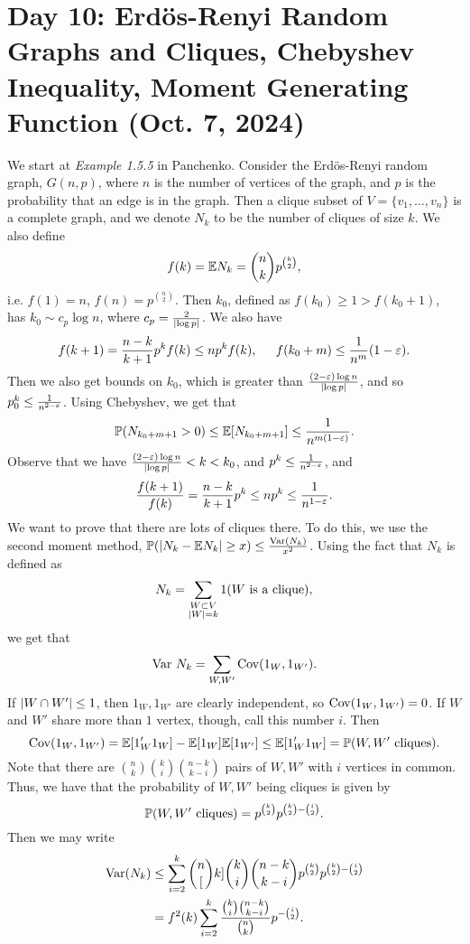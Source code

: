\section{Day 10: Erd\"os-Renyi Random Graphs and Cliques, Chebyshev Inequality, Moment Generating Function (Oct. 7, 2024)}
We start at \textit{Example 1.5.5} in Panchenko. Consider the Erd\"os-Renyi random graph, $G(n, p)$, where $n$ is the number of vertices of the graph, and $p$ is the probability that an edge is in the graph. Then a clique subset of $V = \{v_1, \dots, v_n\}$ is a complete graph, and we denote $N_k$ to be the number of cliques of size $k$. We also define
\[ f(k) = \mathbb E N_k = \binom{n}{k} p^{\binom{k}{{2}}}, \]
i.e. $f(1) = n$, $f(n) = p^{\binom{n}{2}}$. Then $k_0$, defined as $f(k_0) \geq 1 > f(k_0 + 1)$, has $k_0 \sim c_p \log n$, where $c_p = \frac{2}{\left\lvert \log p \right\rvert}$. We also have
\[ f(k + 1) = \frac{n-k}{k+1} p^k f(k) \leq np ^k f(k), \hspace{0.2in} f(k_0 + m) \leq \frac{1}{n^m}(1 - \varepsilon). \]
Then we also get bounds on $k_0$, which is greater than $\frac{(2 - \varepsilon)\log n}{\left\lvert \log p \right\rvert}$, and so $p^k_0 \leq \frac{1}{n^{2 - \varepsilon}}$.
\medskip\newline
Using Chebyshev, we get that
\[ \mathbb P(N_{k_0 + m + 1} > 0) \leq \mathbb E[N_{k_0 + m + 1}] \leq \frac{1}{n^{m(1 - \varepsilon)}}. \]
Observe that we have $\frac{(2 - \varepsilon) \log n}{\left\lvert \log p \right\rvert} < k < k_0$, and $p^k \leq \frac{1}{n^{2-\varepsilon}}$, and
\[ \frac{f(k + 1)}{f(k)} = \frac{n-k}{k+1}p^k \leq np^k \leq \frac{1}{n^{1 - \varepsilon}}. \]
We want to prove that there are lots of cliques there. To do this, we use the second moment method, $\mathbb P(\left\lvert N_k - \mathbb E N_k \right\rvert \geq x) \leq \frac{\operatorname{Var}(N_k)}{x^2}$. Using the fact that $N_k$ is defined as
\[ N_k = \sum_{\substack{W \subset V \\ \left\lvert W \right\rvert = k}} 1(W \text{ is a clique}), \]
we get that
\[ \operatorname{Var} \, N_k = \sum_{W, W'} \mathrm{Cov}(1_W, 1_{W'}). \]
If $\left\lvert W \cap W' \right\rvert \leq 1$, then $1_W, 1_{W'}$ are clearly independent, so $\mathrm{Cov}(1_W, 1_{W'}) = 0$. If $W$ and $W'$ share more than $1$ vertex, though, call this number $i$. Then
\[ \mathrm{Cov}(1_W, 1_{W'}) = \mathbb E [1_W' 1_W] - \mathbb E[1_W] \mathbb E[1_{W'}] \leq \mathbb E[1_W' 1_W] = \mathbb P(W, W' \text{ cliques}). \]
Note that there are $\binom{n}{k} \binom{k}{i} \binom{n-k}{k-i}$ pairs of $W, W'$ with $i$ vertices in common.
Thus, we have that the probability of $W, W'$ being cliques is given by
\[ \mathbb P(W, W' \text{ cliques}) = p^{\binom{k}{2}} p^{\binom{k}{2} - \binom{i}{2}}. \]
Then we may write
\begin{align*}
    \operatorname{Var}(N_k) &\leq \sum_{i=2}^k \binom{n}[k] \binom{k}{i} \binom{n-k}{k-i} p^{\binom{k}{2}} p^{\binom{k}{2} - \binom{i}{2}} \\
    &= f^2(k) \sum_{i=2}^k \frac{\binom{k}{i} \binom{n-k}{k-i}}{\binom{n}{k}} p^{-\binom{i}{2}}.
\end{align*}
